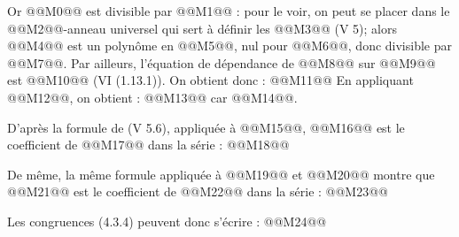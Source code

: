 
Or @@M0@@ est divisible par @@M1@@ :
pour le voir, on peut se placer dans le @@M2@@-anneau universel qui sert à définir les @@M3@@ (V 5); alors @@M4@@ est un polynôme en @@M5@@, nul pour @@M6@@, donc divisible par @@M7@@. Par ailleurs, l'équation de dépendance de @@M8@@ sur @@M9@@ est @@M10@@ (VI (1.13.1)). On obtient donc :
@@M11@@
En appliquant @@M12@@, on obtient :
@@M13@@
car @@M14@@.

D'après la formule de (V 5.6), appliquée à @@M15@@, @@M16@@ est le coefficient de @@M17@@ dans la série :
@@M18@@

De même, la même formule appliquée à @@M19@@ et @@M20@@ montre que @@M21@@ est le coefficient de @@M22@@ dans la série :
@@M23@@

Les congruences (4.3.4) peuvent donc s'écrire :
@@M24@@
